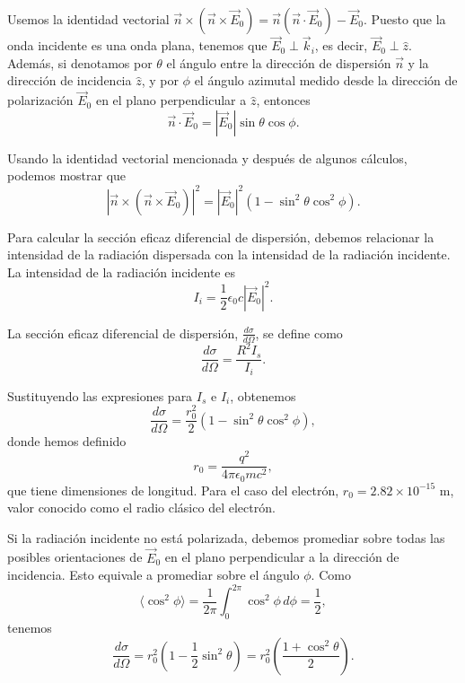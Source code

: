 \documentclass[12pt,a4paper]{book}
\begin{document}
Usemos la identidad vectorial $\vec{n} \times (\vec{n} \times \vec{E}_0) = \vec{n}(\vec{n} \cdot \vec{E}_0) - \vec{E}_0$. Puesto que la onda incidente es una onda plana, tenemos que $\vec{E}_0 \perp \vec{k}_i$, es decir, $\vec{E}_0 \perp \hat{z}$. Además, si denotamos por $\theta$ el ángulo entre la dirección de dispersión $\vec{n}$ y la dirección de incidencia $\hat{z}$, y por $\phi$ el ángulo azimutal medido desde la dirección de polarización $\vec{E}_0$ en el plano perpendicular a $\hat{z}$, entonces
\begin{equation}
\vec{n} \cdot \vec{E}_0 = |\vec{E}_0|\sin\theta\cos\phi.
\end{equation}

Usando la identidad vectorial mencionada y después de algunos cálculos, podemos mostrar que
\begin{equation}
|\vec{n} \times (\vec{n} \times \vec{E}_0)|^2 = |\vec{E}_0|^2(1 - \sin^2\theta\cos^2\phi).
\end{equation}

Para calcular la sección eficaz diferencial de dispersión, debemos relacionar la intensidad de la radiación dispersada con la intensidad de la radiación incidente. La intensidad de la radiación incidente es
\begin{equation}
I_i = \frac{1}{2}\epsilon_0c|\vec{E}_0|^2.
\end{equation}

La sección eficaz diferencial de dispersión, $\frac{d\sigma}{d\Omega}$, se define como
\begin{equation}
\frac{d\sigma}{d\Omega} = \frac{R^2I_s}{I_i}.
\end{equation}

Sustituyendo las expresiones para $I_s$ e $I_i$, obtenemos
\begin{equation}
\frac{d\sigma}{d\Omega} = \frac{r_0^2}{2}(1 - \sin^2\theta\cos^2\phi),
\end{equation}
donde hemos definido
\begin{equation}
r_0 = \frac{q^2}{4\pi\epsilon_0mc^2},
\end{equation}
que tiene dimensiones de longitud. Para el caso del electrón, $r_0 = 2.82 \times 10^{-15}$ m, valor conocido como el radio clásico del electrón.

Si la radiación incidente no está polarizada, debemos promediar sobre todas las posibles orientaciones de $\vec{E}_0$ en el plano perpendicular a la dirección de incidencia. Esto equivale a promediar sobre el ángulo $\phi$. Como
\begin{equation}
\langle\cos^2\phi\rangle = \frac{1}{2\pi}\int_0^{2\pi}\cos^2\phi\,d\phi = \frac{1}{2},
\end{equation}
tenemos
\begin{equation}
\frac{d\sigma}{d\Omega} = r_0^2\left(1 - \frac{1}{2}\sin^2\theta\right) = r_0^2\left(\frac{1 + \cos^2\theta}{2}\right).
\end{equation}
\end{document}
